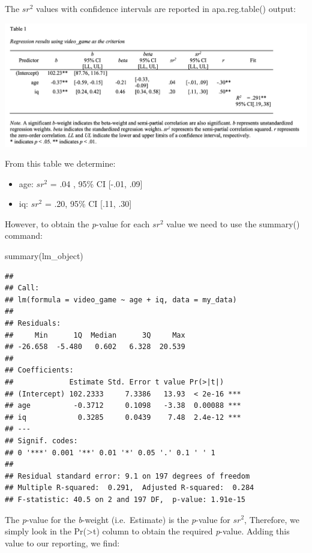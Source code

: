 \documentclass[
]{krantz}
\makeatletter
\newenvironment{Shaded}{\begin{snugshade}}{\end{snugshade}}
\newcommand{\FunctionTok}[1]{\textcolor[rgb]{0,0,0}{#1}}
\newcommand{\NormalTok}[1]{#1}
\newenvironment{kframe}{%
\medskip{}
\setlength{\fboxsep}{.8em}
 \def\at@end@of@kframe{}%
 \ifinner\ifhmode%
  \def\at@end@of@kframe{\end{minipage}}%
  \begin{minipage}{\columnwidth}%
 \fi\fi%
 \def\FrameCommand##1{\hskip\@totalleftmargin \hskip-\fboxsep
 \colorbox{shadecolor}{##1}\hskip-\fboxsep
     \hskip-\linewidth \hskip-\@totalleftmargin \hskip\columnwidth}%
 \MakeFramed {\advance\hsize-\width
   \@totalleftmargin\z@ \linewidth\hsize
   \@setminipage}}%
 {\par\unskip\endMakeFramed%
 \at@end@of@kframe}
\renewenvironment{Shaded}{\begin{kframe}}{\end{kframe}}
\makeatother
\begin{document}
The \(sr^2\) values with confidence intervals are reported in apa.reg.table() output:

\includegraphics[width=0.9\linewidth]{ch_multiple_regression/images/mr_table}

From this table we determine:

\begin{itemize}
\item
  age: \(sr^2\) = .04 , 95\% CI {[}-.01, .09{]}
\item
  iq: \(sr^2\) = .20, 95\% CI {[}.11, .30{]}
\end{itemize}

However, to obtain the \emph{p}-value for each \(sr^2\) value we need to use the summary() command:

\begin{Shaded}
\begin{Highlighting}[]
\FunctionTok{summary}\NormalTok{(lm\_object)}
\end{Highlighting}
\end{Shaded}

\begin{verbatim}
## 
## Call:
## lm(formula = video_game ~ age + iq, data = my_data)
## 
## Residuals:
##     Min      1Q  Median      3Q     Max 
## -26.658  -5.480   0.602   6.328  20.539 
## 
## Coefficients:
##             Estimate Std. Error t value Pr(>|t|)    
## (Intercept) 102.2333     7.3386   13.93  < 2e-16 ***
## age          -0.3712     0.1098   -3.38  0.00088 ***
## iq            0.3285     0.0439    7.48  2.4e-12 ***
## ---
## Signif. codes:  
## 0 '***' 0.001 '**' 0.01 '*' 0.05 '.' 0.1 ' ' 1
## 
## Residual standard error: 9.1 on 197 degrees of freedom
## Multiple R-squared:  0.291,  Adjusted R-squared:  0.284 
## F-statistic: 40.5 on 2 and 197 DF,  p-value: 1.91e-15
\end{verbatim}

The \emph{p}-value for the \emph{b}-weight (i.e.~Estimate) is the \emph{p}-value for \(sr^2\), Therefore, we simply look in the Pr(\textgreater\textbar t\textbar) column to obtain the required \emph{p}-value. Adding this value to our reporting, we find:
\end{document}
